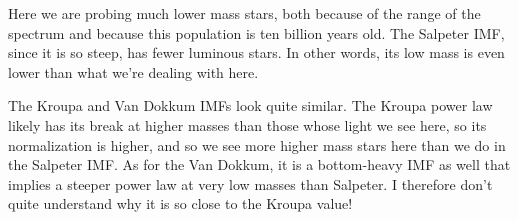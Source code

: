 \documentclass[letterpaper,12pt]{article}
\begin{document}
Here we are probing much lower mass stars, both because of the range of the spectrum and because this population is ten billion years old. The Salpeter IMF, since it is so steep, has fewer luminous stars. In other words, its low mass is even lower than what we're dealing with here.

The Kroupa and Van Dokkum IMFs look quite similar. The Kroupa power law likely has its break at higher masses than those whose light we see here, so its normalization is higher, and so we see more higher mass stars here than we do in the Salpeter IMF. As for the Van Dokkum, it is a bottom-heavy IMF as well that implies a steeper power law at very low masses than Salpeter. I therefore don't quite understand why it is so close to the Kroupa value!
\end{document}
